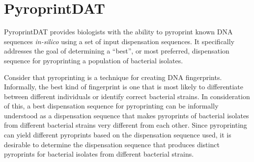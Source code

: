 \documentclass[12pt]{ucthesis}
\begin{document}
   \section{PyroprintDAT}\label{sec:pyroprintdat}
      PyroprintDAT provides biologists with the ability to pyroprint known DNA
      sequences \textit{in-silico} using a set of input dispensation sequences.
      It specifically addresses the goal of determining a ``best'', or most
      preferred, dispensation sequence for pyroprinting a population of bacterial
      isolates.
      
      Consider that pyroprinting is a technique for creating DNA fingerprints.
      Informally, the best kind of fingerprint is one that is most likely to
      differentiate between different individuals or identify correct bacterial
      strains. In consideration of this, a best dispensation sequence for
      pyroprinting can be informally understood as a dispensation sequence that
      makes pyroprints of bacterial isolates from different bacterial strains
      very different from each other. Since pyroprinting can yield different
      pyroprints based on the dispensation sequence used, it is desirable to
      determine the dispensation sequence that produces distinct pyroprints for
      bacterial isolates from different bacterial strains.
\end{document}
